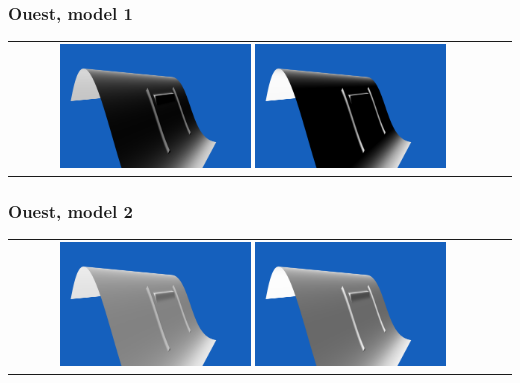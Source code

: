 \documentclass[a4paper]{article}
\begin{document}
\subsubsection{Ouest, model 1}
\begin{tabular}{cc}
\includegraphics[width=0.4\textwidth]{Images/Essais/Essai_7_phong_West_0.png}
\includegraphics[width=0.4\textwidth]{Images/Essais/Essai_7_slint_West_0.png}
\end{tabular}
\subsubsection{Ouest, model 2}
\begin{tabular}{cc}
\includegraphics[width=0.4\textwidth]{Images/Essais/Essai_7_phong_West_1.png}
\includegraphics[width=0.4\textwidth]{Images/Essais/Essai_7_slint_West_1.png}
\end{tabular}
\end{document}
